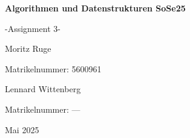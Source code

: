 \begin{titlepage}
    \centering
    \vspace*{3cm}
    {\Huge\bfseries Algorithmen und Datenstrukturen SoSe25 \par}
    \vspace{0.5cm}
    {\Huge -Assignment 3- \par}
    \vspace{1cm}
    {\Large Moritz Ruge \par}
    \vspace{0.1cm}
    {\small Matrikelnummer: 5600961 \par}
    {\Large Lennard Wittenberg \par}
    \vspace{0.1cm}
    {\small Matrikelnummer: ---\par}
    \vfill
    {\large Mai 2025}
\end{titlepage}
